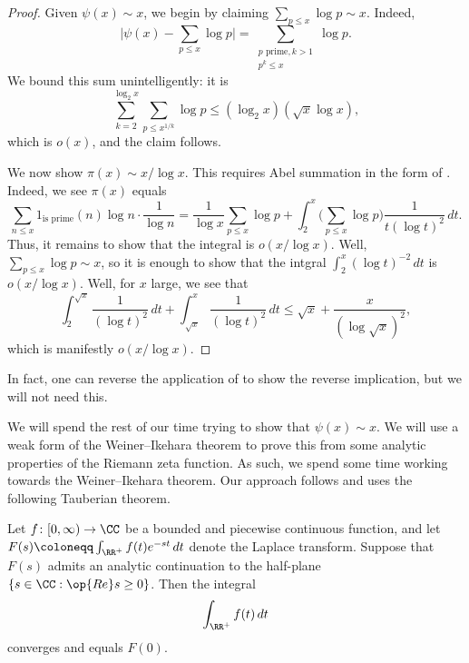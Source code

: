 \documentclass[../thesis.tex]{subfiles}
\begin{document}
\begin{proof}
	Given $\psi(x)\sim x$, we begin by claiming $\sum_{p\le x}\log p\sim x$. Indeed,
	\[\Bigg|\psi(x)-\sum_{p\le x}\log p\Bigg|=\sum_{\substack{p\text{ prime},k>1\\p^k\le x}}\log p.\]
	We bound this sum unintelligently: it is
	\[\sum_{k=2}^{\log_2x}\sum_{p\le x^{1/k}}\log p\le(\log_2x)(\sqrt x\log x),\]
	which is $o(x)$, and the claim follows.

	We now show $\pi(x)\sim x/\log x$. This requires Abel summation in the form of . Indeed, we see $\pi(x)$ equals
	\[\sum_{n\le x}1_{\text{is prime}}(n)\log n\cdot\frac1{\log n}=\frac1{\log x}\sum_{p\le x}\log p+\int_2^x\Bigg(\sum_{p\le x}\log p\Bigg)\frac1{t(\log t)^2}\,dt.\]
	Thus, it remains to show that the integral is $o(x/\log x)$. Well, $\sum_{p\le x}\log p\sim x$, so it is enough to show that the intgral $\int_2^x(\log t)^{-2}\,dt$ is $o(x/\log x)$. Well, for $x$ large, we see that
	\[\int_2^{\sqrt x}\frac1{(\log t)^2}\,dt+\int_{\sqrt x}^x\frac1{(\log t)^2}\,dt\le\sqrt x+\frac{x}{(\log\sqrt x)^2},\]
	which is manifestly $o(x/\log x)$.
\end{proof}
\begin{remark}
	In fact, one can reverse the application of  to show the reverse implication, but we will not need this.
\end{remark}
We will spend the rest of our time trying to show that $\psi(x)\sim x$. We will use a weak form of the Weiner--Ikehara theorem to prove this from some analytic properties of the Riemann zeta function. As such, we spend some time working towards the Weiner--Ikehara theorem. Our approach follows \cite{newman-pnt} and uses the following Tauberian theorem.
\begin{theorem}[Newman] \label{thm:newman-simple-tauber}
	Let $f\colon[0,\infty)\to\CC$ be a bounded and piecewise continuous function, and let $F(s)\coloneqq\int_{\RR^+}f(t)e^{-st}\,dt$ denote the Laplace transform. Suppose that $F(s)$ admits an analytic continuation to the half-plane $\{s\in\CC:\op{Re}s\ge0\}$. Then the integral
	\[\int_{\RR^+}f(t)\,dt\]
	converges and equals $F(0)$.
\end{theorem}
\end{document}
